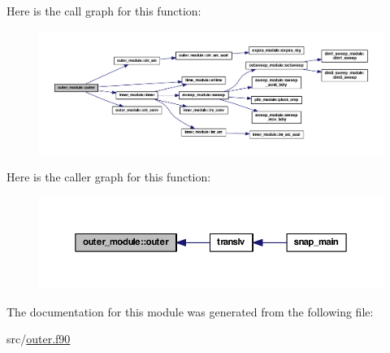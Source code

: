Here is the call graph for this function\-:\nopagebreak
\begin{figure}[H]
\begin{center}
\leavevmode
\includegraphics[width=350pt]{classouter__module_a2deee1d5431094eb8d9c17c09666a844_cgraph}
\end{center}
\end{figure}




Here is the caller graph for this function\-:\nopagebreak
\begin{figure}[H]
\begin{center}
\leavevmode
\includegraphics[width=350pt]{classouter__module_a2deee1d5431094eb8d9c17c09666a844_icgraph}
\end{center}
\end{figure}




The documentation for this module was generated from the following file\-:\begin{DoxyCompactItemize}
\item 
src/\hyperlink{outer_8f90}{outer.\-f90}\end{DoxyCompactItemize}
